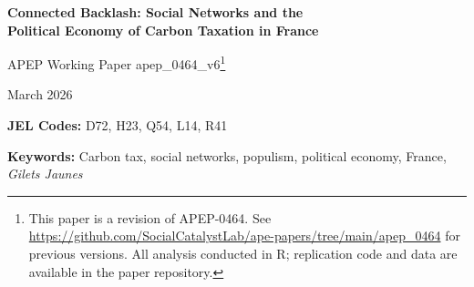 \documentclass[12pt]{article}
\newcommand{\rn}{Rassemblement National}
\newcommand{\gj}{\textit{Gilets Jaunes}}
\newcommand{\depts}{d\'{e}partements}
\begin{document}

\begin{titlepage}
\begin{center}
\vspace*{1cm}

{\LARGE\bfseries Connected Backlash: Social Networks and the\\
Political Economy of Carbon Taxation in France}

\vspace{1cm}

{\large APEP Working Paper apep\_0464\_v6\footnote{This paper is a revision of APEP-0464. See \url{https://github.com/SocialCatalystLab/ape-papers/tree/main/apep_0464} for previous versions. All analysis conducted in R; replication code and data are available in the paper repository.}}

\vspace{0.5cm}

{\large March 2026}

\vspace{1cm}

\begin{abstract}
\noindent Social networks transmitted the political backlash against France's carbon tax far beyond its geographic incidence. Using Facebook's Social Connectedness Index across 96 \depts{} and ten elections (2002--2024), I estimate that network exposure to fuel-vulnerable areas raised \rn{} vote share by 1.35 percentage points per standard deviation under standard parallel trends, with a \citet{rambachan2023more} sensitivity analysis bounding the effect at [0.40, 2.21] under zero tolerance for pre-trend violations. A descriptive channel decomposition reveals dual transmission: fuel-specific and immigration-related network exposures both predict \rn{} gains, consistent with networks carrying a bundle of populist mobilization cues. Pre-treatment coefficients are uniformly negative---the mirror image of the post-treatment effect---ruling out confounding from time-invariant network correlates. The effect activates at the 2014 carbon tax introduction, persists through the post-\gj{} era, and is absent for Green and center-right parties.
\end{abstract}

\vspace{0.3cm}

\textbf{JEL Codes:} D72, H23, Q54, L14, R41

\textbf{Keywords:} Carbon tax, social networks, populism, political economy, France, \textit{Gilets Jaunes}

\end{center}
\end{titlepage}
\end{document}
